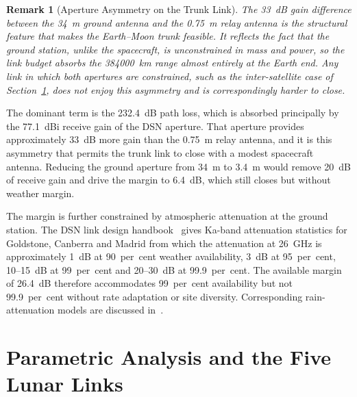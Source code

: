 \documentclass[11pt,a4paper]{article}
\newtheorem{remark}{Remark}
\begin{document}
\begin{remark}[Aperture Asymmetry on the Trunk Link]
\label{rem:asymmetry}
The \SI{33}{dB} gain difference between the \SI{34}{m} ground antenna and the \SI{0.75}{m} relay antenna is the structural feature that makes the Earth--Moon trunk feasible. It reflects the fact that the ground station, unlike the spacecraft, is unconstrained in mass and power, so the link budget absorbs the \SI{384000}{km} range almost entirely at the Earth end. Any link in which both apertures are constrained, such as the inter-satellite case of Section~\ref{sec:parametric}, does not enjoy this asymmetry and is correspondingly harder to close.
\end{remark}

The dominant term is the \SI{232.4}{dB} path loss, which is absorbed principally by the \SI{77.1}{dBi} receive gain of the DSN aperture. That aperture provides approximately \SI{33}{dB} more gain than the \SI{0.75}{m} relay antenna, and it is this asymmetry that permits the trunk link to close with a modest spacecraft antenna. Reducing the ground aperture from \SI{34}{m} to \SI{3.4}{m} would remove \SI{20}{dB} of receive gain and drive the margin to \SI{6.4}{dB}, which still closes but without weather margin.

The margin is further constrained by atmospheric attenuation at the ground station. The DSN link design handbook~\cite{dsn_810_005} gives Ka-band attenuation statistics for Goldstone, Canberra and Madrid from which the attenuation at \SI{26}{GHz} is approximately \SI{1}{dB} at 90~per~cent weather availability, \SI{3}{dB} at 95~per~cent, \SI{10}{}--\SI{15}{dB} at 99~per~cent and \SI{20}{}--\SI{30}{dB} at 99.9~per~cent. The available margin of \SI{26.4}{dB} therefore accommodates 99~per~cent availability but not 99.9~per~cent without rate adaptation or site diversity. Corresponding rain-attenuation models are discussed in~\cite{islam_ka_band}.


\section{Parametric Analysis and the Five Lunar Links}
\label{sec:parametric}
\end{document}
